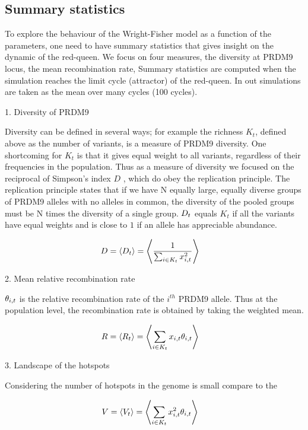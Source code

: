 \documentclass{article}
\begin{document}
\subsection*{Summary statistics} 

To explore the behaviour of the Wright-Fisher model as a function of the parameters, one need to have summary statistics that gives insight on the dynamic of the red-queen. We focus on four measures, 
the diversity at PRDM9 locus, the mean recombination rate, 
Summary statistics are computed when the simulation reaches the limit cycle (attractor) of the red-queen. In out simulations are taken as the mean over many cycles (100 cycles). 

1. Diversity of PRDM9

Diversity can be defined in several ways; for example the richness $K_{t}$, defined above as the number of variants, is a measure of PRDM9 diversity.
One shortcoming for $K_{t}$ is that it gives equal weight to all variants, regardless of their frequencies in the population.
Thus as a measure of diversity we focused on the reciprocal of Simpson's index $D$ \cite{Hill1973}, which do obey the replication principle.
The replication principle states that if we have N equally large, equally diverse groups of PRDM9 alleles with no alleles in common, the diversity of the pooled groups must be N times the diversity of a single group.
$D_{t}$ equals $K_{t}$ if all the variants have equal weights and is close to $1$ if an allele has appreciable abundance.

\begin{align}
     D &= \left< D_{t} \right> = \left< \dfrac{1}{\sum_{i \in K_{t}} x_{i,t}^2} \right> 
\end{align}

2. Mean relative recombination rate

$\theta _{i,t}$ is the relative recombination rate of the $i^{th}$ PRDM9 allele. Thus at the population level, the recombination rate is obtained by taking the weighted mean.

\begin{align}
    R &= \left< R_{t} \right> = \left< \sum_{i \in K_{t}} x_{i,t} \theta _{i,t} \right> 
\end{align}

3. Landscape of the hotspots

Considering the number of hotspots in the genome is small compare to the 

\begin{align}
     V &= \left< V_{t} \right> = \left< \sum_{i \in K_{t}} x_{i,t}^2 \theta _{i,t} \right> 
\end{align}
\end{document}
